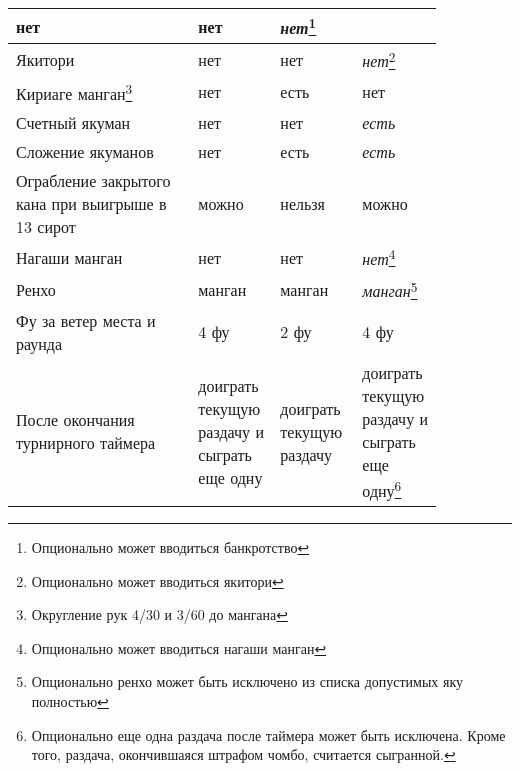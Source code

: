 \begin{tabularx}{\linewidth}{L{0.4\linewidth}L{0.15\linewidth}L{0.15\linewidth}L{0.15\linewidth}}
	нет &
	нет &
	\textit{нет}\footnote{Опционально может вводиться банкротство} \\
	\midrule
	Якитори &
	нет &
	нет &
	\textit{нет}\footnote{Опционально может вводиться якитори} \\
	\midrule
	Кириаге манган\footnote{Округление рук 4/30 и 3/60 до мангана} &
	нет &
	есть &
	нет \\
	\midrule
	Счетный якуман &
	нет &
	нет &
	\textit{есть} \\
	\midrule
	Сложение якуманов &
	нет &
	есть &
	\textit{есть} \\
	\midrule
	Ограбление закрытого кана при выигрыше в 13 сирот &
	можно &
	нельзя &
	можно \\
	\midrule
	Нагаши манган &
	нет &
	нет &
	\textit{нет}\footnote{Опционально может вводиться нагаши манган} \\
	\midrule
	Ренхо &
	манган &
	манган &
	\textit{манган}\footnote{Опционально ренхо может быть исключено из списка допустимых яку полностью} \\
	\midrule
	Фу за ветер места и раунда &
	4 фу &
	2 фу &
	4 фу \\
	\midrule
	После окончания турнирного таймера &
	доиграть текущую раздачу и сыграть еще одну &
	доиграть текущую раздачу &
	доиграть текущую раздачу и сыграть еще одну\footnote{Опционально еще одна раздача после таймера может быть исключена. Кроме того, раздача, окончившаяся штрафом чомбо, считается сыгранной.} \\
	

\end{tabularx}
